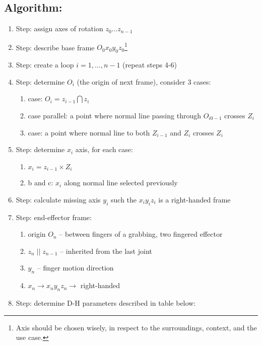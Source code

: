 \documentclass[12pt, a4paper]{extarticle}
\begin{document}
	\subsection{Algorithm:}
	\begin{enumerate}
		\setlength\itemsep{-0.3em}
		\item Step: assign axes of rotation $z_0 \dots z_{n-1}$
		\item Step: describe base frame $O_0 x_0 y_0 z_0$\footnote{Axis should be chosen wisely, in respect to the surroundings, context, and the use case.}
		\item Step: create a loop $i=1, \dots, n-1$ (repeat steps 4-6)
		\item Step: determine $O_i$ (the origin of next frame), consider 3 cases:
		\begin{enumerate}
			\item case: $O_i = z_{i-1}  \bigcap z_i$
			\item case parallel: a point where normal line passing through $O_{i0-1}$ crosses $Z_i$
			\item case: a point where normal line to both $Z_{i-1}$ and $Z_i$ crosses $Z_i$
		\end{enumerate}
		\item Step: determine $x_i$ axis, for each case:
		\begin{enumerate}
			\item $x_i = z_{i-1} \times Z_i$
			\item b and c: $x_i$ along normal line selected previously
		\end{enumerate}
		\item Step: calculate missing axis $y_i$ such the $x_i y_i z_i$ is a right-handed frame
		\item Step: end-effector frame:
		\begin{enumerate}
			\item origin $O_n$ -- between fingers of a grabbing, two fingered effector
			\item $z_n \; || \; z_{n-1}$ -- inherited from the last joint
			\item $y_n$ -- finger motion direction
			\item $x_n \rightarrow x_n y_n z_n \rightarrow $ right-handed
		\end{enumerate}
		\item Step: determine D-H parameters described in table below:


\end{enumerate}
\end{document}
